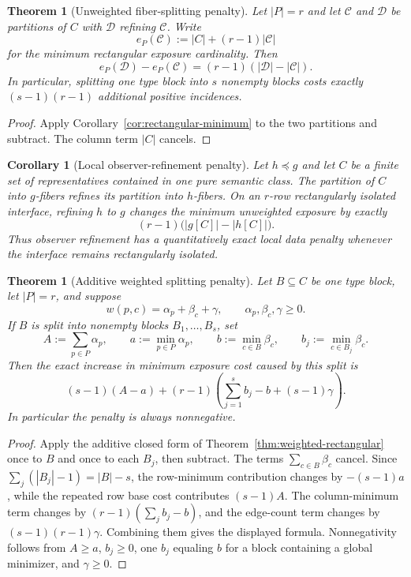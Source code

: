 \documentclass[11pt]{article}
\newtheorem{theorem}[definition]{Theorem}
\newtheorem{corollary}[definition]{Corollary}
\begin{document}
\begin{theorem}[Unweighted fiber-splitting penalty]
\label{thm:split-penalty}
Let $|P|=r$ and let $\mathcal C$ and $\mathcal D$ be partitions of $C$ with
$\mathcal D$ refining $\mathcal C$.  Write
\[
 e_P(\mathcal C):=|C|+(r-1)|\mathcal C|
\]
for the minimum rectangular exposure cardinality.  Then
\[
 \boxed{
 e_P(\mathcal D)-e_P(\mathcal C)
 =(r-1)(|\mathcal D|-|\mathcal C|).
 }
\]
In particular, splitting one type block into $s$ nonempty blocks costs exactly
$(s-1)(r-1)$ additional positive incidences.
\end{theorem}

\begin{proof}
Apply Corollary~\ref{cor:rectangular-minimum} to the two partitions and
subtract.  The column term $|C|$ cancels.
\end{proof}

\begin{corollary}[Local observer-refinement penalty]
\label{cor:local-refinement-penalty}
Let $h\preceq g$ and let $C$ be a finite set of representatives contained in
one pure semantic class.  The partition of $C$ into $g$-fibers refines its
partition into $h$-fibers.  On an $r$-row rectangularly isolated interface,
refining $h$ to $g$ changes the minimum unweighted exposure by exactly
\[
 \boxed{
 (r-1)\bigl(|g[C]|-|h[C]|\bigr).
 }
\]
Thus observer refinement has a quantitatively exact local data penalty whenever
the interface remains rectangularly isolated.
\end{corollary}

\begin{theorem}[Additive weighted splitting penalty]
\label{thm:weighted-split-penalty}
Let $B\subseteq C$ be one type block, let $|P|=r$, and suppose
\[
 w(p,c)=\alpha_p+\beta_c+\gamma,
 \qquad \alpha_p,\beta_c,\gamma\ge0.
\]
If $B$ is split into nonempty blocks $B_1,\ldots,B_s$, set
\[
 A:=\sum_{p\in P}\alpha_p,
 \qquad a:=\min_{p\in P}\alpha_p,
 \qquad b:=\min_{c\in B}\beta_c,
 \qquad b_j:=\min_{c\in B_j}\beta_c.
\]
Then the exact increase in minimum exposure cost caused by this split is
\[
 \boxed{
 (s-1)(A-a)
 +(r-1)\left(\sum_{j=1}^s b_j-b+(s-1)\gamma\right).
 }
\]
In particular the penalty is always nonnegative.
\end{theorem}

\begin{proof}
Apply the additive closed form of Theorem~\ref{thm:weighted-rectangular} once
to $B$ and once to each $B_j$, then subtract.  The terms
$\sum_{c\in B}\beta_c$ cancel.  Since
$\sum_j(|B_j|-1)=|B|-s$, the row-minimum contribution changes by
$-(s-1)a$, while the repeated row base cost contributes $(s-1)A$.  The
column-minimum term changes by $(r-1)(\sum_j b_j-b)$, and the edge-count term
changes by $(s-1)(r-1)\gamma$.  Combining them gives the displayed formula.
Nonnegativity follows from $A\ge a$, $b_j\ge0$, one $b_j$ equaling $b$ for a
block containing a global minimizer, and $\gamma\ge0$.
\end{proof}
\end{document}
